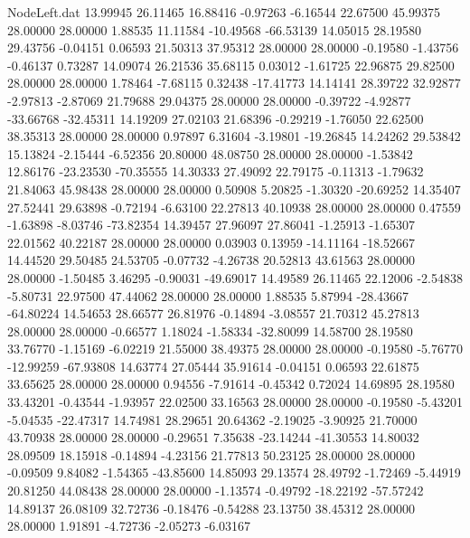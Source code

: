 \begin{filecontents}{NodeLeft.dat}
  13.99945   26.11465   16.88416    -0.97263   -6.16544   22.67500   45.99375   28.00000   28.00000    1.88535   11.11584  -10.49568  -66.53139
  14.05015   28.19580   29.43756    -0.04151    0.06593   21.50313   37.95312   28.00000   28.00000   -0.19580   -1.43756   -0.46137    0.73287
  14.09074   26.21536   35.68115     0.03012   -1.61725   22.96875   29.82500   28.00000   28.00000    1.78464   -7.68115    0.32438  -17.41773
  14.14141   28.39722   32.92877    -2.97813   -2.87069   21.79688   29.04375   28.00000   28.00000   -0.39722   -4.92877  -33.66768  -32.45311
  14.19209   27.02103   21.68396    -0.29219   -1.76050   22.62500   38.35313   28.00000   28.00000    0.97897    6.31604   -3.19801  -19.26845
  14.24262   29.53842   15.13824    -2.15444   -6.52356   20.80000   48.08750   28.00000   28.00000   -1.53842   12.86176  -23.23530  -70.35555
  14.30333   27.49092   22.79175    -0.11313   -1.79632   21.84063   45.98438   28.00000   28.00000    0.50908    5.20825   -1.30320  -20.69252
  14.35407   27.52441   29.63898    -0.72194   -6.63100   22.27813   40.10938   28.00000   28.00000    0.47559   -1.63898   -8.03746  -73.82354
  14.39457   27.96097   27.86041    -1.25913   -1.65307   22.01562   40.22187   28.00000   28.00000    0.03903    0.13959  -14.11164  -18.52667
  14.44520   29.50485   24.53705    -0.07732   -4.26738   20.52813   43.61563   28.00000   28.00000   -1.50485    3.46295   -0.90031  -49.69017
  14.49589   26.11465   22.12006    -2.54838   -5.80731   22.97500   47.44062   28.00000   28.00000    1.88535    5.87994  -28.43667  -64.80224
  14.54653   28.66577   26.81976    -0.14894   -3.08557   21.70312   45.27813   28.00000   28.00000   -0.66577    1.18024   -1.58334  -32.80099
  14.58700   28.19580   33.76770    -1.15169   -6.02219   21.55000   38.49375   28.00000   28.00000   -0.19580   -5.76770  -12.99259  -67.93808
  14.63774   27.05444   35.91614    -0.04151    0.06593   22.61875   33.65625   28.00000   28.00000    0.94556   -7.91614   -0.45342    0.72024
  14.69895   28.19580   33.43201    -0.43544   -1.93957   22.02500   33.16563   28.00000   28.00000   -0.19580   -5.43201   -5.04535  -22.47317
  14.74981   28.29651   20.64362    -2.19025   -3.90925   21.70000   43.70938   28.00000   28.00000   -0.29651    7.35638  -23.14244  -41.30553
  14.80032   28.09509   18.15918    -0.14894   -4.23156   21.77813   50.23125   28.00000   28.00000   -0.09509    9.84082   -1.54365  -43.85600
  14.85093   29.13574   28.49792    -1.72469   -5.44919   20.81250   44.08438   28.00000   28.00000   -1.13574   -0.49792  -18.22192  -57.57242
  14.89137   26.08109   32.72736    -0.18476   -0.54288   23.13750   38.45312   28.00000   28.00000    1.91891   -4.72736   -2.05273   -6.03167

\end{filecontents}
